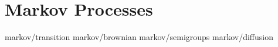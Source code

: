 \chapter	{Markov Processes}

	{markov/transition}
	{markov/brownian}
	{markov/semigroups}
	{markov/diffusion}
